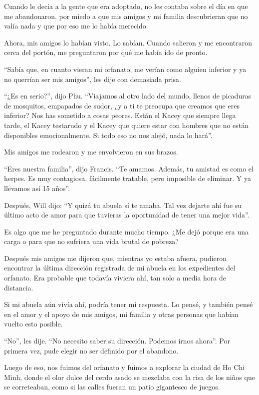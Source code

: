 Cuando le decía a la gente que era adoptado, no les contaba sobre el día
en que me abandonaron, por miedo a que mis amigos y mi familia
descubrieran que no valía nada y que por eso me lo había merecido.

Ahora, mis amigos lo habían visto. Lo sabían. Cuando salieron y me
encontraron cerca del portón, me preguntaron por qué me había ido de
pronto.

``Sabía que, en cuanto vieran mi orfanato, me verían como alguien
inferior y ya no querrían ser mis amigos'', les dije con demasiada
prisa.

``¿Es en serio?'', dijo Phu. ``Viajamos al otro lado del mundo, llenos
de picaduras de mosquitos, empapados de sudor, ¿y a ti te preocupa que
creamos que eres inferior? Nos has sometido a cosas peores. Están el
Kacey que siempre llega tarde, el Kacey testarudo y el Kacey que quiere
estar con hombres que no están disponibles emocionalmente. Si todo eso
no nos alejó, nada lo hará''.

Mis amigos me rodearon y me envolvieron en sus brazos.

``Eres nuestra familia'', dijo Francis. ``Te amamos. Además, tu amistad
es como el herpes. Es muy contagiosa, fácilmente tratable, pero
imposible de eliminar. Y ya llevamos así 15 años''.

Después, Will dijo: ``Y quizá tu abuela sí te amaba. Tal vez dejarte ahí
fue su último acto de amor para que tuvieras la oportunidad de tener una
mejor vida''.

Es algo que me he preguntado durante mucho tiempo. ¿Me dejó porque era
una carga o para que no sufriera una vida brutal de pobreza?

Después mis amigos me dijeron que, mientras yo estaba afuera, pudieron
encontrar la última dirección registrada de mi abuela en los expedientes
del orfanato. Era probable que todavía viviera ahí, tan solo a media
hora de distancia.

Si mi abuela aún vivía ahí, podría tener mi respuesta. Lo pensé, y
también pensé en el amor y el apoyo de mis amigos, mi familia y otras
personas que habían vuelto esto posible.

``No'', les dije. ``No necesito saber su dirección. Podemos irnos
ahora''. Por primera vez, pude elegir no ser definido por el abandono.

Luego de eso, nos fuimos del orfanato y fuimos a explorar la ciudad de
Ho Chi Minh, donde el olor dulce del cerdo asado se mezclaba con la risa
de los niños que se correteaban, como si las calles fueran un patio
gigantesco de juegos.

